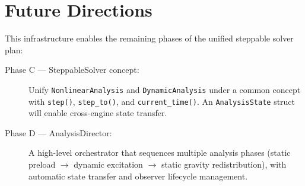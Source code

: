 \section{Future Directions}
\label{sec:sd-future}

This infrastructure enables the remaining phases of the unified
steppable solver plan:

\begin{description}
  \item[Phase C — SteppableSolver concept:]  Unify
    \texttt{NonlinearAnalysis} and \texttt{DynamicAnalysis} under a
    common concept with \texttt{step()}, \texttt{step\_to()}, and
    \texttt{current\_time()}.  An \texttt{AnalysisState} struct will
    enable cross-engine state transfer.
  \item[Phase D — AnalysisDirector:]  A high-level orchestrator that
    sequences multiple analysis phases (static preload $\to$ dynamic
    excitation $\to$ static gravity redistribution), with automatic
    state transfer and observer lifecycle management.
\end{description}
